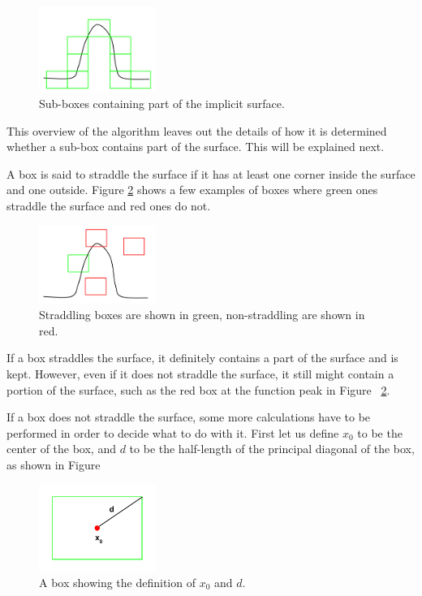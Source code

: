 \documentclass[conference]{acmsiggraph}
\begin{document}
\begin{figure}[ht]
  \centering
  \includegraphics[width=1.5in]{figures/surface_boxes.png}
  \caption{Sub-boxes containing part of the implicit surface.}
  \label{fig:surface_boxes}
\end{figure}

This overview of the algorithm leaves out the details of how it is 
determined whether a sub-box contains part of the surface.  This will
be explained next.

A box is said to straddle the surface if it has at least one corner
inside the surface and one outside.  Figure \ref{fig:straddling_boxes}
shows a few examples of boxes where green ones straddle the surface
and red ones do not.

\begin{figure}[ht]
  \centering
  \includegraphics[width=1.5in]{figures/straddling_boxes.png}
  \caption{Straddling boxes are shown in green, non-straddling are shown in red.}
  \label{fig:straddling_boxes}
\end{figure}

If a box straddles the surface, it definitely contains a part of the 
surface and is kept.  However, even if it does not straddle the surface,
it still might contain a portion of the surface, such as the red box at
the function peak in Figure ~\ref{fig:straddling_boxes}.

If a box does not straddle the surface, some more calculations have to
be performed in order to decide what to do with it.  First let us 
define $x_{0}$ to be the center of the box, and $d$ to be the half-length
of the principal diagonal of the box, as shown in Figure

\begin{figure}[ht]
  \centering
  \includegraphics[width=1.5in]{figures/box.png}
  \caption{A box showing the definition of $x_0$ and $d$.}
  \label{fig:box}
\end{figure}
\end{document}
